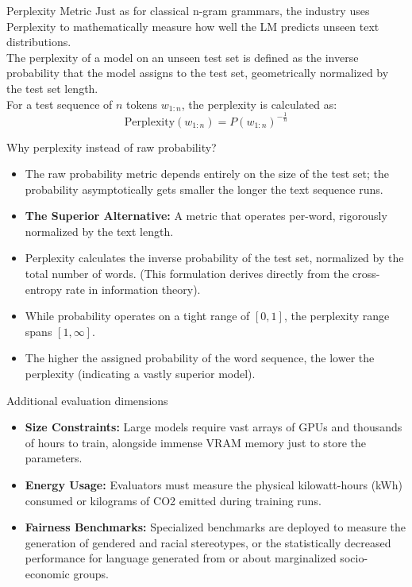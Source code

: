 \documentclass[aspectratio=169]{beamer}
\begin{document}
\begin{frame}{Perplexity Metric}\justifying
    Just as for classical n-gram grammars, the industry uses Perplexity to mathematically measure how well the LM predicts unseen text distributions. \\
    \vspace{0.3cm}
    The perplexity of a model on an unseen test set is defined as the inverse probability that the model assigns to the test set, geometrically normalized by the test set length. \\
    \vspace{0.3cm}
    For a test sequence of $n$ tokens $w_{1:n}$, the perplexity is calculated as:
    \[ \text{Perplexity}(w_{1:n}) = P(w_{1:n})^{-\frac{1}{n}} \]
\end{frame}

\begin{frame}{Why perplexity instead of raw probability?}\justifying
    \begin{itemize}
        \item The raw probability metric depends entirely on the size of the test set; the probability asymptotically gets smaller the longer the text sequence runs.
        \item \textbf{The Superior Alternative:} A metric that operates per-word, rigorously normalized by the text length.
        \item Perplexity calculates the inverse probability of the test set, normalized by the total number of words. (This formulation derives directly from the cross-entropy rate in information theory).
        \item While probability operates on a tight range of $[0, 1]$, the perplexity range spans $[1, \infty]$.
        \item The higher the assigned probability of the word sequence, the lower the perplexity (indicating a vastly superior model).
    \end{itemize}
\end{frame}

\begin{frame}{Additional evaluation dimensions}\justifying
    \begin{itemize}
        \item \textbf{Size Constraints:} Large models require vast arrays of GPUs and thousands of hours to train, alongside immense VRAM memory just to store the parameters.
        \item \textbf{Energy Usage:} Evaluators must measure the physical kilowatt-hours (kWh) consumed or kilograms of CO2 emitted during training runs.
        \item \textbf{Fairness Benchmarks:} Specialized benchmarks are deployed to measure the generation of gendered and racial stereotypes, or the statistically decreased performance for language generated from or about marginalized socio-economic groups.
    \end{itemize}
\end{frame}
\end{document}
